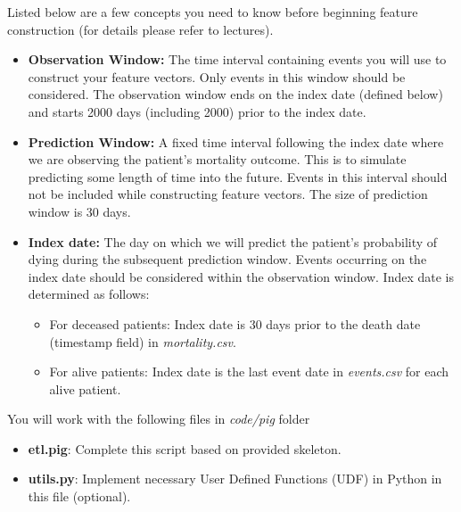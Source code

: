 \documentclass[12pt]{article}
\begin{document}
Listed below are a few concepts you need to know before beginning feature construction (for details please refer to lectures). 

\begin{itemize}
\item \textbf{Observation Window:} The time interval containing events you will use to construct your feature vectors. Only events in this window should be considered. The observation window ends on the index date (defined below) and starts 2000 days (including 2000) prior to the index date.
\item \textbf{Prediction Window:} A fixed time interval following the index date where we are observing the patient's mortality outcome. This is to simulate predicting some length of time into the future. Events in this interval should not be included while constructing feature vectors. The size of prediction window is 30 days.
\item \textbf{Index date:} The day on which we will predict the patient's probability of dying during the subsequent prediction window. Events occurring on the index date should be considered within the observation window. Index date is determined as follows:
\begin{itemize}
\item For deceased patients: Index date is 30 days prior to the death date (timestamp field) in \textit{mortality.csv}. 
\item For alive patients: Index date is the last event date in \textit{events.csv} for each alive patient. 
\end{itemize}
\end{itemize}

You will work with the following files in \textit{code/pig} folder
\begin{itemize}
\item \textbf{etl.pig}: Complete this script based on provided skeleton. 
\item \textbf{utils.py}: Implement necessary User Defined Functions (UDF) in Python in this file (optional).
\end{itemize}
\end{document}
